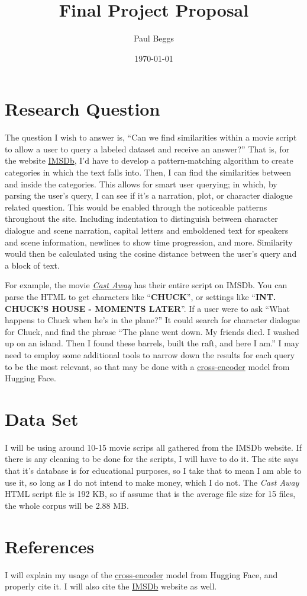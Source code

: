 \documentclass[12pt]{article}
\title{Final Project Proposal}
\author{Paul Beggs}
\date{\today}
\begin{document}
\maketitle

\section{Research Question}

The question I wish to answer is, ``Can we find similarities within a movie script to allow a user to query a labeled dataset and receive an answer?'' That is, for the website \href{https://imsdb.com/}{IMSDb}, I'd have to develop a pattern-matching algorithm to create categories in which the text falls into. Then, I can find the similarities between and inside the categories. This allows for smart user querying; in which, by parsing the user's query, I can see if it's a narration, plot, or character dialogue related question. This would be enabled through the noticeable patterns throughout the site. Including indentation to distinguish between character dialogue and scene narration, capital letters and emboldened text for speakers and scene information, newlines to show time progression, and more. Similarity would then be calculated using the cosine distance between the user's query and a block of text.

For example, the movie \href{https://imsdb.com/scripts/Cast-Away.html}{\textit{Cast Away}} has their entire script on IMSDb. You can parse the HTML to get characters like ``\textbf{CHUCK}'', or settings like ``\textbf{INT.  CHUCK'S HOUSE - MOMENTS LATER}''. If a user were to ask ``What happens to Chuck when he's in the plane?'' It could search for character dialogue for Chuck, and find the phrase ``The plane went down. My friends died. I washed up on an island. Then I found these barrels, built the raft, and here I am.'' I may need to employ some additional tools to narrow down the results for each query to be the most relevant, so that may be done with a \href{https://huggingface.co/cross-encoder/ms-marco-MiniLM-L6-v2}{cross-encoder} model from Hugging Face.


\section{Data Set}

I will be using around 10-15 movie scrips all gathered from the IMSDb website. If there is any cleaning to be done for the scripts, I will have to do it. The site says that it's database is for educational purposes, so I take that to mean I am able to use it, so long as I do not intend to make money, which I do not. The \textit{Cast Away} HTML script file is 192 KB, so if assume that is the average file size for 15 files, the whole corpus will be 2.88 MB.

\section{References}

I will explain my usage of the \href{https://huggingface.co/cross-encoder/ms-marco-MiniLM-L6-v2}{cross-encoder} model from Hugging Face, and properly cite it. I will also cite the \href{https://imsdb.com/}{IMSDb} website as well.
\end{document}
